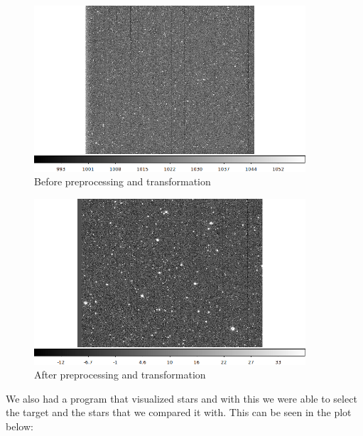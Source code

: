 \documentclass[a4paper,12pt]{article}
\begin{document}
\begin{minipage}{0.42\textwidth}
    \begin{figure}[H]
        \centering
        \includegraphics[width=0.9\textwidth]{../PSCH-20181012/psch/20181012/before200.png}
        \caption{Before preprocessing and transformation}
    \end{figure}
\end{minipage}
\begin{minipage}{0.42\textwidth}
    \begin{figure}[H]
        \centering
        \includegraphics[width=0.9\textwidth]{../PSCH-20181012/psch/20181012/after200.png}
        \caption{After preprocessing and transformation}
    \end{figure}
\end{minipage}

\vspace{0.5cm}

\par We also had a program that visualized stars and with this we were able to select the target
and the stars that we compared it with. This can be seen in the plot below:
\end{document}
